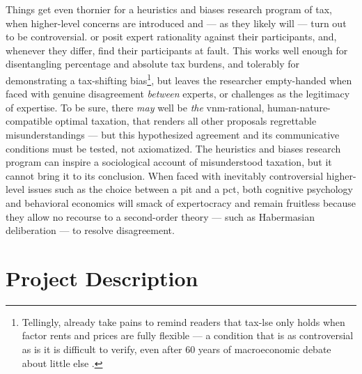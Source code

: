 \begin{enumerate}
	Things get even thornier for a heuristics and biases research program of tax, when higher-level concerns are introduced and --- as they likely will --- turn out to be controversial.
	\citeauthor{McCafferyBaron2004} or \citeauthor{SausgruberTyran2011} posit expert rationality against their participants, and, whenever they differ, find their participants at fault.
	This works well enough for disentangling percentage and absolute tax burdens, and tolerably for demonstrating a tax-shifting bias\footnote{
		Tellingly, \citeauthor{SausgruberTyran2011} already take pains to remind readers that \gls{tax-lse} only holds when factor rents and prices are fully flexible --- a condition that is as controversial as is it is difficult to verify, even after 60 years of macroeconomic debate about little else \citep{Wapshott2011}.
	},
	but leaves the researcher empty-handed when faced with genuine disagreement \emph{between} experts, or challenges as the legitimacy of expertise.
	To be sure, there \emph{may} well be \emph{the} \gls{vnm}-rational, human-nature-compatible optimal taxation, that renders all other proposals regrettable misunderstandings --- but this hypothesized agreement and its communicative conditions must be tested, not axiomatized.
	The heuristics and biases research program can inspire a sociological account of misunderstood taxation, but it cannot bring it to its conclusion.
	When faced with inevitably controversial higher-level issues such as the choice between a \gls{pit} and a \gls{pct}, both cognitive psychology and behavioral economics will smack of expertocracy and remain fruitless because they allow no recourse to a second-order theory \citep[125]{GutmannThompson-2004-aa} --- such as Habermasian deliberation --- to resolve disagreement.
\end{enumerate}

\section{Project Description}


